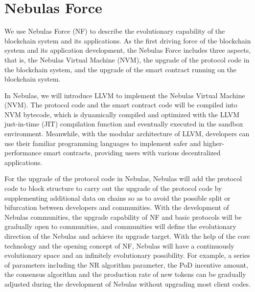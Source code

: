 \section{Nebulas Force}
\label{sec:nebulasforce}

We use Nebulas Force (NF) to describe the evolutionary capability of the blockchain system and its applications. As the first driving force of the blockchain system and its application development, the Nebulas Force includes three aspects, that is, the Nebulas Virtual Machine (NVM), the upgrade of the protocol code in the blockchain system, and the upgrade of the smart contract running on the blockchain system.


In Nebulas, we will introduce LLVM to implement the Nebulas Virtual Machine (NVM). The protocol code and the smart contract code will be compiled into NVM bytecode, which is dynamically compiled and optimized with the LLVM just-in-time (JIT) compilation function and eventually executed in the sandbox environment. Meanwhile, with the modular architecture of LLVM, developers can use their familiar programming languages to implement safer and higher-performance smart contracts, providing users with various decentralized applications.


For the upgrade of the protocol code in Nebulas, Nebulas will add the protocol code to block structure to carry out the upgrade of the protocol code by supplementing additional data on chains so as to avoid the possible split or bifurcation between developers and communities. With the development of Nebulas communities, the upgrade capability of NF and basic protocols will be gradually open to communities, and communities will define the evolutionary direction of the Nebulas and achieve its upgrade target. With the help of the core technology and the opening concept of NF, Nebulas will have a continuously evolutionary space and an infinitely evolutionary possibility. For example, a series of parameters including the NR algorithm parameter, the PoD incentive amount, the consensus algorithm and the production rate of new tokens can be gradually adjusted during the development of Nebulas without upgrading most client codes.

